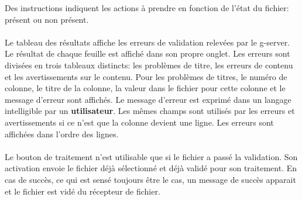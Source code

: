 Des instructions indiquent les actions à prendre en fonction de l'état du fichier: présent ou non présent. %

\paragraph{}
Le tableau des résultats affiche les erreurs de validation relevées par le \gls{g-server}.
Le résultat de chaque feuille est affiché dans son propre onglet.
Les erreurs sont divisées en trois tableaux distincts: les problèmes de titre, les erreurs de contenu et les avertissements sur le contenu.
Pour les problèmes de titres, le numéro de colonne, le titre de la colonne, la valeur dans le fichier pour cette colonne et le message d'erreur sont affichés.
Le message d'erreur est exprimé dans un langage intelligible par un \textbf{utilisateur}.
Les mêmes champs sont utilisés par les erreurs et avertissements si ce n'est que la colonne devient une ligne.
Les erreurs sont affichées dans l'ordre des lignes.

\paragraph{}
Le bouton de traitement n'est utilisable que si le fichier a passé la validation.
Son activation envoie le fichier déjà sélectionné et déjà validé pour son traitement.
En cas de succès, ce qui est sensé toujours être le cas, un message de succès apparait et le fichier est vidé du récepteur de fichier.
